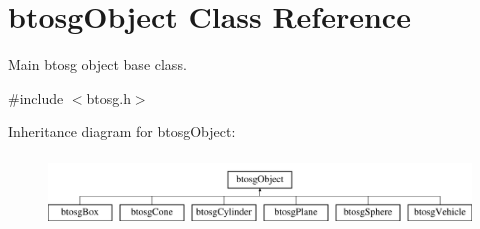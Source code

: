 \hypertarget{classbtosgObject}{}\section{btosg\+Object Class Reference}
\label{classbtosgObject}


Main btosg object base class.  




{\ttfamily \#include $<$btosg.\+h$>$}

Inheritance diagram for btosg\+Object\+:\begin{figure}[H]
\begin{center}
\leavevmode
\includegraphics[height=1.904762cm]{classbtosgObject}
\end{center}
\end{figure}
